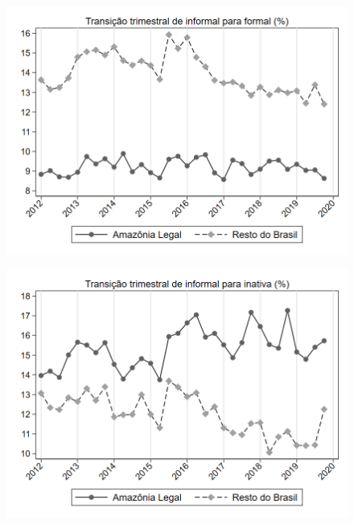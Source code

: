 \begin{frame}[label=_transicao_ocupacao_sh_informal_sh_formal]{}
\textit{\hyperlink{_transicao_ocupacao}{}}
\begin{figure}
  \centering
  \includegraphics[width=1.0\linewidth]{../../analysis/output/transicao_ocupacao/_transicao_ocupacao_sh_informal_sh_formal.png}
  \caption{}
  \label{fig:_transicao_ocupacao_sh_informal_sh_formal}
\end{figure}
\end{frame}

\begin{frame}[label=_transicao_ocupacao_sh_informal_sh_inativa]{}
\textit{\hyperlink{_transicao_ocupacao}{}}
\begin{figure}
  \centering
  \includegraphics[width=1.0\linewidth]{../../analysis/output/transicao_ocupacao/_transicao_ocupacao_sh_informal_sh_inativa.png}
  \caption{}
  \label{fig:_transicao_ocupacao_sh_informal_sh_inativa}
\end{figure}
\end{frame}
